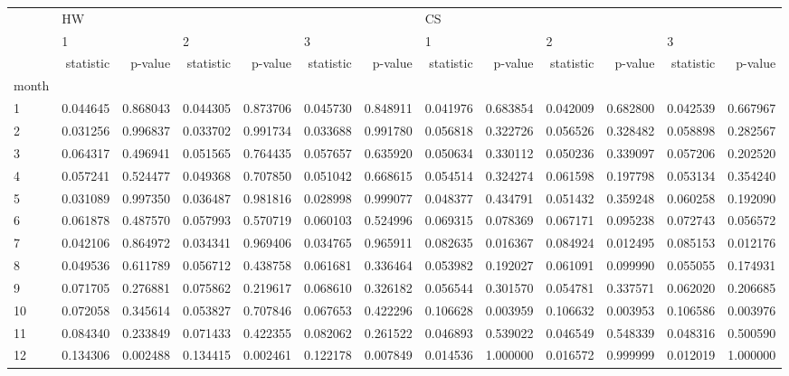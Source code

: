 \begin{tabular}{lrrrrrrrrrrrr}
\toprule
{} & \multicolumn{6}{l}{HW} & \multicolumn{6}{l}{CS} \\
{} & \multicolumn{2}{l}{1} & \multicolumn{2}{l}{2} & \multicolumn{2}{l}{3} & \multicolumn{2}{l}{1} & \multicolumn{2}{l}{2} & \multicolumn{2}{l}{3} \\
{} & statistic &   p-value & statistic &   p-value & statistic &   p-value & statistic &   p-value & statistic &   p-value & statistic &   p-value \\
month &           &           &           &           &           &           &           &           &           &           &           &           \\
\midrule
1     &  0.044645 &  0.868043 &  0.044305 &  0.873706 &  0.045730 &  0.848911 &  0.041976 &  0.683854 &  0.042009 &  0.682800 &  0.042539 &  0.667967 \\
2     &  0.031256 &  0.996837 &  0.033702 &  0.991734 &  0.033688 &  0.991780 &  0.056818 &  0.322726 &  0.056526 &  0.328482 &  0.058898 &  0.282567 \\
3     &  0.064317 &  0.496941 &  0.051565 &  0.764435 &  0.057657 &  0.635920 &  0.050634 &  0.330112 &  0.050236 &  0.339097 &  0.057206 &  0.202520 \\
4     &  0.057241 &  0.524477 &  0.049368 &  0.707850 &  0.051042 &  0.668615 &  0.054514 &  0.324274 &  0.061598 &  0.197798 &  0.053134 &  0.354240 \\
5     &  0.031089 &  0.997350 &  0.036487 &  0.981816 &  0.028998 &  0.999077 &  0.048377 &  0.434791 &  0.051432 &  0.359248 &  0.060258 &  0.192090 \\
6     &  0.061878 &  0.487570 &  0.057993 &  0.570719 &  0.060103 &  0.524996 &  0.069315 &  0.078369 &  0.067171 &  0.095238 &  0.072743 &  0.056572 \\
7     &  0.042106 &  0.864972 &  0.034341 &  0.969406 &  0.034765 &  0.965911 &  0.082635 &  0.016367 &  0.084924 &  0.012495 &  0.085153 &  0.012176 \\
8     &  0.049536 &  0.611789 &  0.056712 &  0.438758 &  0.061681 &  0.336464 &  0.053982 &  0.192027 &  0.061091 &  0.099990 &  0.055055 &  0.174931 \\
9     &  0.071705 &  0.276881 &  0.075862 &  0.219617 &  0.068610 &  0.326182 &  0.056544 &  0.301570 &  0.054781 &  0.337571 &  0.062020 &  0.206685 \\
10    &  0.072058 &  0.345614 &  0.053827 &  0.707846 &  0.067653 &  0.422296 &  0.106628 &  0.003959 &  0.106632 &  0.003953 &  0.106586 &  0.003976 \\
11    &  0.084340 &  0.233849 &  0.071433 &  0.422355 &  0.082062 &  0.261522 &  0.046893 &  0.539022 &  0.046549 &  0.548339 &  0.048316 &  0.500590 \\
12    &  0.134306 &  0.002488 &  0.134415 &  0.002461 &  0.122178 &  0.007849 &  0.014536 &  1.000000 &  0.016572 &  0.999999 &  0.012019 &  1.000000 \\
\bottomrule
\end{tabular}
